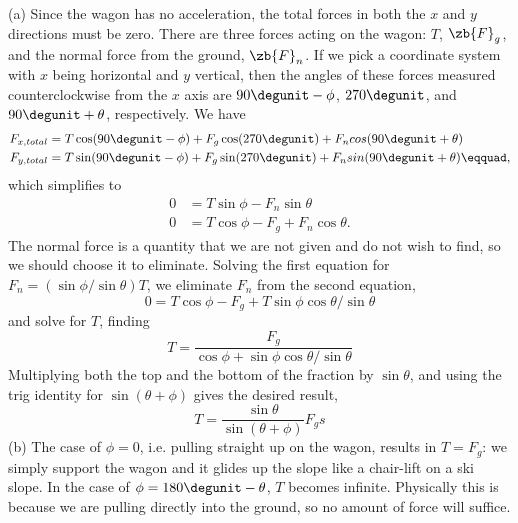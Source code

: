 (a) Since the wagon has no acceleration, the total
forces in both the $x$ and $y$ directions must be zero. There
are three forces acting on the wagon: $T$, $\zb{F}_g$, and the normal
force from the ground, $\zb{F}_n$. If we pick a coordinate system
with $x$ being horizontal and $y$ vertical, then the angles of
these forces measured counterclockwise from the $x$ axis are
$90\degunit-\phi$, $270\degunit$, and $90\degunit+\theta$, respectively.
We have
\begin{align*}
	F_{x,total} &= T\cos(90\degunit-\phi) + F_{g}\cos(270\degunit) +
				F_ncos(90\degunit+\theta) \\
	F_{y,total} &= T\sin(90\degunit-\phi) + F_{g}\sin(270\degunit) +
				F_nsin(90\degunit+\theta)\eqquad,
\end{align*}
which simplifies to
\begin{align*}
	0 &= T \sin \phi - F_n \sin \theta\\
	0 &= T \cos \phi  - F_{g} + F_n \cos \theta  .
\end{align*}
The normal force is a quantity that we are not given and do
not wish to find, so we should choose it to eliminate.
Solving the first equation for $F_n=(\sin \phi/\sin \theta)T$, we
eliminate $F_n$ from the second equation,
\begin{equation*}
	0 = T \cos \phi  - F_{g} + T \sin \phi \cos \theta/\sin \theta
\end{equation*}
and solve for $T$, finding
\begin{equation*}
	T = \frac{F_g}{\cos\phi+\sin\phi\cos\theta/\sin\theta}
\end{equation*}
Multiplying both the top and the bottom of the fraction by
$\sin \theta$, and using the trig identity for $\sin(\theta+\phi)$ gives the
desired result,
\begin{equation*}
	T = \frac{\sin\theta}{\sin(\theta+\phi)}F_gs
\end{equation*}
(b) The case of $\phi=0$, i.e. pulling straight up on the wagon,
results in $T=F_{g}$: we simply support the wagon and it glides
up the slope like a chair-lift on a ski slope. In the case
of $\phi=180\degunit-\theta$, $T$ becomes infinite. Physically this is
because we are pulling directly into the ground, so no
amount of force will suffice.
